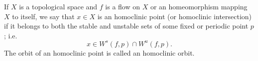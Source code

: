 \documentclass[12pt]{article}
\begin{document}
If $X$ is a topological space and $f$ is a flow on $X$ or an homeomorphism mapping $X$ to itself, we say that $x\in X$ is an homoclinic point (or homoclinic intersection) if it belongs to both the stable and unstable sets of some fixed or periodic point $p$; i.e. $$x\in W^s(f,p)\cap W^u(f,p).$$
The orbit of an homoclinic point is called an homoclinic orbit.
\end{document}
